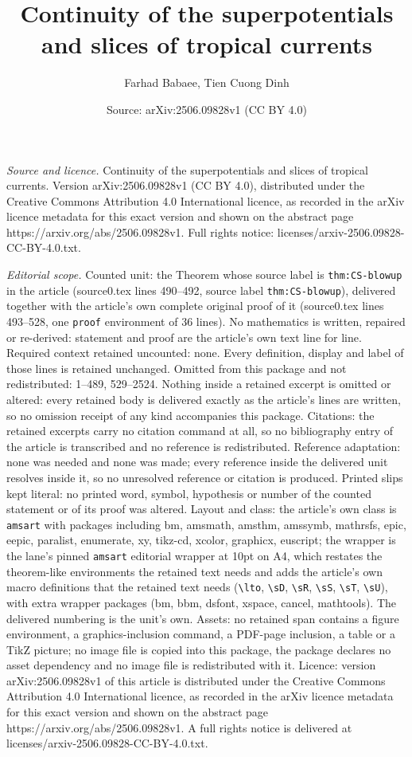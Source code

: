 \documentclass[10pt,a4paper]{amsart}
\title[Continuity of the superpotentials and slices of tropical cur]{Continuity of the superpotentials and slices of tropical currents}
\author{Farhad Babaee, Tien Cuong Dinh}
\date{Source: arXiv:2506.09828v1 (CC BY 4.0)}
\begin{document}
\maketitle

\noindent\emph{Source and licence.} Continuity of the superpotentials and slices of tropical currents. Version arXiv:2506.09828v1 (CC BY 4.0), distributed under the Creative Commons Attribution 4.0 International licence, as recorded in the arXiv licence metadata for this exact version and shown on the abstract page https://arxiv.org/abs/2506.09828v1. Full rights notice: licenses/arxiv-2506.09828-CC-BY-4.0.txt.\par\smallskip

\noindent\textit{Editorial scope.} Counted unit: the Theorem whose source label is \texttt{thm:CS-blowup} in the article (source0.tex lines 490--492, source label \texttt{thm:CS-blowup}), delivered together with the article's own complete original proof of it (source0.tex lines 493--528, one \texttt{proof} environment of 36 lines). No mathematics is written, repaired or re-derived: statement and proof are the article's own text line for line. Required context retained uncounted: none. Every definition, display and label of those lines is retained unchanged. Omitted from this package and not redistributed: 1--489, 529--2524. Nothing inside a retained excerpt is omitted or altered: every retained body is delivered exactly as the article's lines are written, so no omission receipt of any kind accompanies this package. Citations: the retained excerpts carry no citation command at all, so no bibliography entry of the article is transcribed and no reference is redistributed. Reference adaptation: none was needed and none was made; every reference inside the delivered unit resolves inside it, so no unresolved reference or citation is produced. Printed slips kept literal: no printed word, symbol, hypothesis or number of the counted statement or of its proof was altered. Layout and class: the article's own class is \texttt{amsart} with packages including bm, amsmath, amsthm, amssymb, mathrsfs, epic, eepic, paralist, enumerate, xy, tikz-cd, xcolor, graphicx, euscript; the wrapper is the lane's pinned \texttt{amsart} editorial wrapper at 10pt on A4, which restates the theorem-like environments the retained text needs and adds the article's own macro definitions that the retained text needs (\texttt{\textbackslash lto}, \texttt{\textbackslash sD}, \texttt{\textbackslash sR}, \texttt{\textbackslash sS}, \texttt{\textbackslash sT}, \texttt{\textbackslash sU}), with extra wrapper packages (bm, bbm, dsfont, xspace, cancel, mathtools). The delivered numbering is the unit's own. Assets: no retained span contains a figure environment, a graphics-inclusion command, a PDF-page inclusion, a table or a TikZ picture; no image file is copied into this package, the package declares no asset dependency and no image file is redistributed with it. Licence: version arXiv:2506.09828v1 of this article is distributed under the Creative Commons Attribution 4.0 International licence, as recorded in the arXiv licence metadata for this exact version and shown on the abstract page https://arxiv.org/abs/2506.09828v1. A full rights notice is delivered at licenses/arxiv-2506.09828-CC-BY-4.0.txt. 
\end{document}
